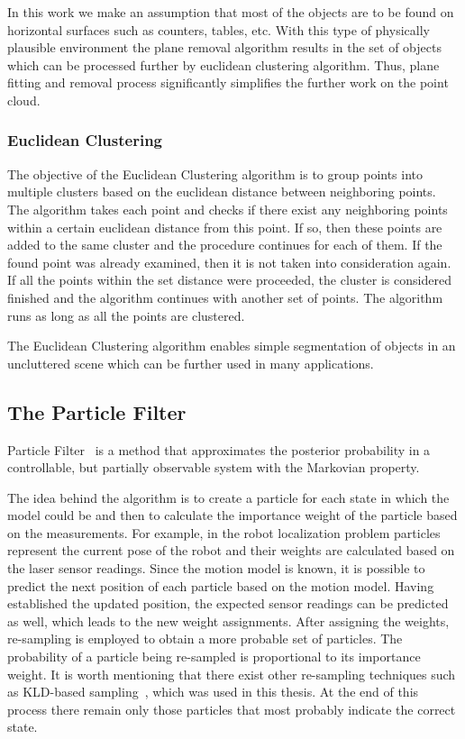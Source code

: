 In this work we make an assumption that most of the 
objects are to be found on horizontal surfaces such as counters, tables, etc. With this type of physically plausible environment the plane removal algorithm results in the set of objects which can be processed further by euclidean clustering algorithm. Thus, plane fitting and removal process significantly simplifies the further work on the point cloud.



\subsubsection{Euclidean Clustering}
The objective of the Euclidean Clustering algorithm is to group points into multiple clusters based on the euclidean distance between neighboring points. The algorithm takes each point and checks if there exist any neighboring points within a certain euclidean distance from this point. If so, then these points are added to the same cluster and the procedure continues for each of them. If the found point was already examined, then it is not taken into consideration again. If all the points within the set distance were proceeded, the cluster is considered finished and the algorithm continues with another set of points. The algorithm runs as long as all the points are clustered. 

The Euclidean Clustering algorithm enables simple segmentation of objects in an uncluttered scene which can be further used in many applications.   

\subsection{The Particle Filter}
Particle Filter~\cite{Thrun02d} is a method that approximates the posterior probability in a controllable, but partially observable system with the Markovian property. 

The idea behind the algorithm is to create a particle for each state in which the model could be and then to calculate the importance weight of the particle based on the measurements. For example, in the robot localization problem particles represent the current pose of the robot and their weights are calculated based on the laser sensor readings. Since the motion model is known, it is possible to predict the next position of each particle based on the motion model. Having established the updated position, the expected sensor readings can be predicted as well, which leads to the new weight assignments. After assigning the weights, re-sampling is employed to obtain a more probable set of particles. The probability of a particle being re-sampled is proportional to its importance weight. It is worth mentioning that there exist other re-sampling techniques such as KLD-based sampling~\cite{Fox01KLD}, which was used in this thesis.  At the end of this process there remain only those particles that most probably indicate the correct state.

